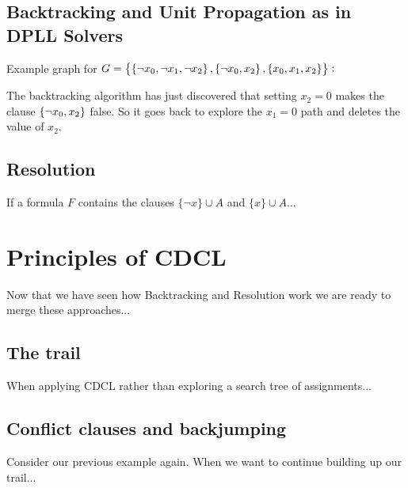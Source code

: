 \subsection{Backtracking and Unit Propagation as in DPLL Solvers}
\begin{example}
Example graph for $G=\set{\set{\lnot x_0,\lnot x_1,\lnot x_2},\set{\lnot x_0,x_2},\set{x_0,x_1,x_2}}:$
\begin{center}
\end{center}
The backtracking algorithm has just discovered that setting $x_2 = 0$ makes the
clause $\set{\lnot x_0 , x_2}$ false. So it goes back to explore the $x_1 = 0$ path and deletes
the value of $x_2$.
\end{example}
\subsection{Resolution}

If a formula \(F\) contains the clauses \(\{\neg x\} \cup A\) and \(\{x\} \cup A\)...

\newpage
\section{Principles of CDCL}

Now that we have seen how Backtracking and Resolution work we are ready to merge these approaches...

\subsection{The trail}

When applying CDCL rather than exploring a search tree of assignments...

\subsection{Conflict clauses and backjumping}

Consider our previous example again. When we want to continue building up our trail...


